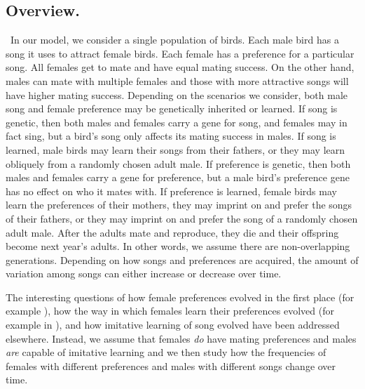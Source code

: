 \documentclass[12pt]{article}
\begin{document}
\subsection*{Overview. }
\ In our model, we consider a single population of birds. Each male bird has a song it uses to attract female birds. Each female has a preference for a particular song. All females get to mate and have equal mating success. On the other hand, males can mate with multiple females and those with more attractive songs will have higher mating success. Depending on the scenarios we consider, both male song and female preference may be genetically inherited or learned. If song is genetic, then both males and females carry a gene for song, and females may in fact sing, but a bird's song only affects its mating success in males. If song is learned, male birds may learn their songs from their fathers, or they may learn obliquely from a randomly chosen adult male. If preference is genetic, then both males and females carry a gene for preference, but a male bird's preference gene has no effect on who it mates with. If preference is learned, female birds may learn the preferences of their mothers, they may imprint on and prefer the songs of their fathers, or they may imprint on and prefer the song of a randomly chosen adult male. After the adults mate and reproduce, they die and their offspring become next year's adults. In other words, we assume there are non-overlapping generations. Depending on how songs and preferences are acquired, the amount of variation among songs can either increase or decrease over time.

The interesting questions of how female preferences evolved in the first place (for example \cite{Kirkpatrick:1982kl}), how the way in which females learn their preferences evolved (for example in \cite{Tramm:2008ij,Chaffee:2013bs}), and how imitative learning of song evolved \cite{Aoki:1989bh,Olofsson:2008dq} have been addressed elsewhere. Instead, we assume that females \emph{do} have mating preferences and males \emph{are} capable of imitative learning and we then study how the frequencies of females with different preferences and males with different songs change over time.  
\end{document}
